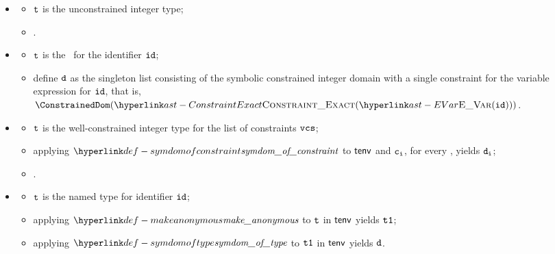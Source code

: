 \ProseParagraph
\OneApplies
\begin{itemize}
  \item {}
  \begin{itemize}
    \item $\vt$ is the unconstrained integer type;
    \item {}.
  \end{itemize}

  \item {}
  \begin{itemize}
    \item $\vt$ is the \parameterizedintegertype\ for the identifier $\id$;
    \item define $\vd$ as the singleton list consisting of the
          symbolic constrained integer domain with a single constraint for the variable expression for $\id$,
          that is, \\ $\ConstrainedDom(\ConstraintExact(\EVar(\id)))$.
  \end{itemize}

  \item {}
  \begin{itemize}
    \item $\vt$ is the well-constrained integer type for the list of constraints $\vcs$;
    \item applying $\symdomofconstraint$ to $\tenv$ and $\vc_\vi$, for every \Proselistrange{$\vi$}{$\vcs$},
          yields $\vd_\vi$;
    \item {}.
  \end{itemize}

  \item {}
  \begin{itemize}
    \item $\vt$ is the named type for identifier $\id$;
    \item applying $\makeanonymous$ to $\vt$ in $\tenv$ yields $\vtone$;
    \item applying $\symdomoftype$ to $\vtone$ in $\tenv$ yields $\vd$.
  \end{itemize}
\end{itemize}

\FormallyParagraph
\begin{mathpar}
\end{mathpar}

